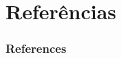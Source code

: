 \documentclass{beamer}
\begin{document}
\section{Referências}
\begin{frame}[t, allowframebreaks]
    \frametitle{References}
    \printbibliography
\end{frame}

\end{document}
